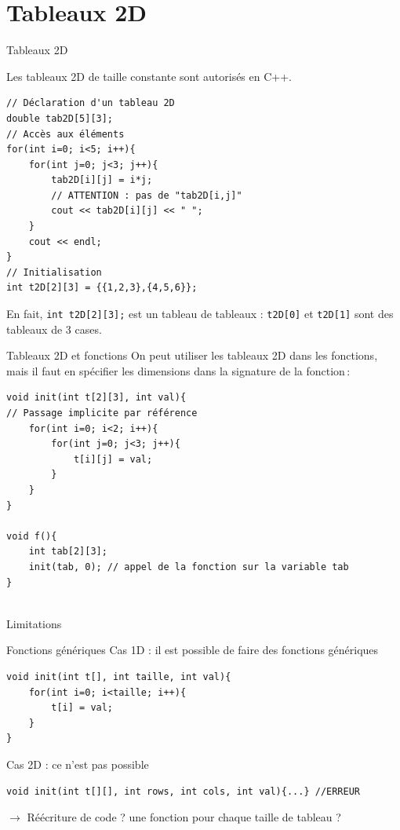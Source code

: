 \section{Tableaux 2D}

\begin{frame}[fragile=singleslide]{Tableaux 2D}

	Les tableaux 2D de taille constante sont autorisés en C++.

	\begin{verbatim}
// Déclaration d'un tableau 2D
double tab2D[5][3];
// Accès aux éléments
for(int i=0; i<5; i++){
    for(int j=0; j<3; j++){
	    tab2D[i][j] = i*j;
        // ATTENTION : pas de "tab2D[i,j]"
        cout << tab2D[i][j] << " ";
    }
    cout << endl;
}
// Initialisation
int t2D[2][3] = {{1,2,3},{4,5,6}};
	\end{verbatim}
En fait, \texttt{int t2D[2][3];} est un tableau de tableaux : \texttt{t2D[0]} et \texttt{t2D[1]} sont des tableaux de 3 cases.
\end{frame}

\begin{frame}[fragile=singleslide]{Tableaux 2D et fonctions}
    On peut utiliser les tableaux 2D dans les fonctions, mais il faut en spécifier les dimensions dans la signature de la fonction\,:
    \begin{verbatim}
void init(int t[2][3], int val){
// Passage implicite par référence
    for(int i=0; i<2; i++){
        for(int j=0; j<3; j++){
            t[i][j] = val;
        }
    }
}

void f(){
    int tab[2][3];
    init(tab, 0); // appel de la fonction sur la variable tab
}
        
    \end{verbatim}
\end{frame}

\begin{frame}[fragile=singleslide]{Limitations}
	\begin{alertblock}{Fonctions génériques}
    Cas 1D : il est possible de faire des fonctions génériques
    \begin{verbatim}
void init(int t[], int taille, int val){
    for(int i=0; i<taille; i++){
        t[i] = val;
    }
}
    \end{verbatim}
    Cas 2D : ce n'est pas possible
    \begin{verbatim}
void init(int t[][], int rows, int cols, int val){...} //ERREUR        
    \end{verbatim}
    \end{alertblock}
    
    $\rightarrow$ Réécriture de code ? une fonction pour chaque taille de tableau ?
\end{frame}

